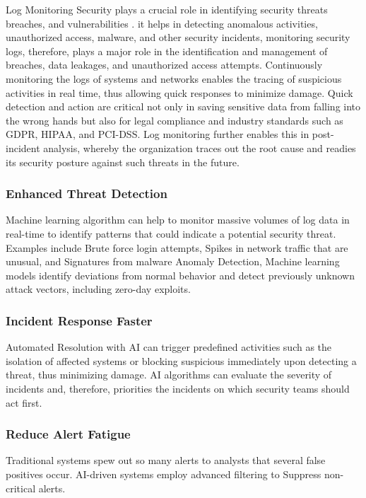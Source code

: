 Log Monitoring Security plays a crucial role in identifying security threats breaches, and vulnerabilities \cite{wirkuttis2017artificial}. it helps in detecting anomalous activities, unauthorized access, malware, and other security incidents, monitoring security logs, therefore, plays a major role in the identification and management of breaches, data leakages, and unauthorized access attempts. Continuously monitoring the logs of systems and networks enables the tracing of suspicious activities in real time, thus allowing quick responses to minimize damage. Quick detection and action are critical not only in saving sensitive data from falling into the wrong hands but also for legal compliance and industry standards such as GDPR, HIPAA, and PCI-DSS. Log monitoring further enables this in post-incident analysis, whereby the organization traces out the root cause and readies its security posture against such threats in the future\cite{kaur2023artificial, helpnetsecurity_2024}. 

\subsubsection{Enhanced Threat Detection}
Machine learning algorithm can help to  monitor massive volumes of log data in real-time to identify patterns that could indicate a potential security threat. Examples include Brute force login attempts, Spikes in network traffic that are unusual, and Signatures from malware Anomaly Detection, Machine learning models identify deviations from normal behavior and detect previously unknown attack vectors, including zero-day exploits.

\subsubsection{Incident Response Faster}
Automated Resolution with AI can trigger predefined activities such as the isolation of affected systems or blocking suspicious immediately upon detecting a threat, thus minimizing damage. AI algorithms can evaluate the severity of incidents and, therefore, priorities the incidents on which security teams should act first.

\subsubsection{Reduce Alert Fatigue}
Traditional systems spew out so many alerts to analysts that several false positives occur. AI-driven systems employ advanced filtering to Suppress non-critical alerts.

